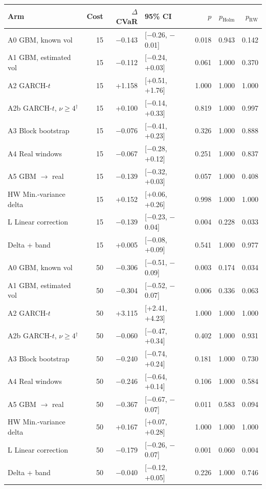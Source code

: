 \begin{tabular}{lrrlrrr}
\toprule
Arm & Cost & $\Delta$CVaR & 95\% CI & $p$ & $p_{\text{Holm}}$ & $p_{\text{RW}}$ \\
\midrule
A0 GBM, known vol & 15 & $-$0.143 & [$-$0.26, $-$0.01] & 0.018 & 0.943 & 0.142 \\
A1 GBM, estimated vol & 15 & $-$0.112 & [$-$0.24, +0.03] & 0.061 & 1.000 & 0.370 \\
A2 GARCH-$t$ & 15 & +1.158 & [+0.51, +1.76] & 1.000 & 1.000 & 1.000 \\
A2b GARCH-$t$, $\nu\ge4$$^\dagger$ & 15 & +0.100 & [$-$0.14, +0.33] & 0.819 & 1.000 & 0.997 \\
A3 Block bootstrap & 15 & $-$0.076 & [$-$0.41, +0.23] & 0.326 & 1.000 & 0.888 \\
A4 Real windows & 15 & $-$0.067 & [$-$0.28, +0.12] & 0.251 & 1.000 & 0.837 \\
A5 GBM $\to$ real & 15 & $-$0.139 & [$-$0.32, +0.03] & 0.057 & 1.000 & 0.408 \\
HW Min.-variance delta & 15 & +0.152 & [+0.06, +0.26] & 0.998 & 1.000 & 1.000 \\
L Linear correction & 15 & $-$0.139 & [$-$0.23, $-$0.04] & 0.004 & 0.228 & 0.033 \\
Delta + band & 15 & +0.005 & [$-$0.08, +0.09] & 0.541 & 1.000 & 0.977 \\
A0 GBM, known vol & 50 & $-$0.306 & [$-$0.51, $-$0.09] & 0.003 & 0.174 & 0.034 \\
A1 GBM, estimated vol & 50 & $-$0.304 & [$-$0.52, $-$0.07] & 0.006 & 0.336 & 0.063 \\
A2 GARCH-$t$ & 50 & +3.115 & [+2.41, +4.23] & 1.000 & 1.000 & 1.000 \\
A2b GARCH-$t$, $\nu\ge4$$^\dagger$ & 50 & $-$0.060 & [$-$0.47, +0.34] & 0.402 & 1.000 & 0.931 \\
A3 Block bootstrap & 50 & $-$0.240 & [$-$0.74, +0.24] & 0.181 & 1.000 & 0.730 \\
A4 Real windows & 50 & $-$0.246 & [$-$0.64, +0.14] & 0.106 & 1.000 & 0.584 \\
A5 GBM $\to$ real & 50 & $-$0.367 & [$-$0.67, $-$0.07] & 0.011 & 0.583 & 0.094 \\
HW Min.-variance delta & 50 & +0.167 & [+0.07, +0.28] & 1.000 & 1.000 & 1.000 \\
L Linear correction & 50 & $-$0.179 & [$-$0.26, $-$0.07] & 0.001 & 0.060 & 0.004 \\
Delta + band & 50 & $-$0.040 & [$-$0.12, +0.05] & 0.226 & 1.000 & 0.746 \\
\bottomrule
\end{tabular}
